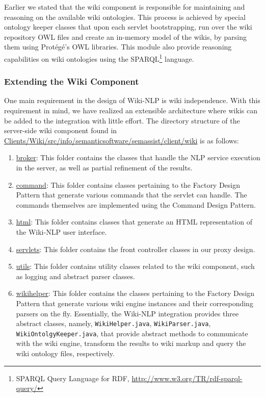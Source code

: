 \blankline
Earlier we stated that the wiki component is responsible for maintaining and reasoning on the available wiki ontologies. This process is achieved by special ontology keeper classes that upon each servlet bootstrapping, run over the wiki repository OWL files and create an in-memory model of the wikis, by parsing them using Prot\'{e}g\'{e}'s OWL libraries. This module also provide reasoning capabilities on wiki ontologies using the SPARQL\footnote{SPARQL Query Language for RDF, \url{http://www.w3.org/TR/rdf-sparql-query/}} language.

\subsubsection{Extending the Wiki Component}
One main requirement in the design of Wiki-NLP is wiki independence. With this requirement in mind, we have realized an extensible architecture where wikis can be added to the integration with little effort. The directory structure of the server-side wiki component found in \url{Clients/Wiki/src/info/semanticsoftware/semassist/client/wiki} is as follows:

\begin{enumerate}
\item\url{broker}: This folder contains the classes that handle the NLP service execution in the \sa server, as well as partial refinement of the results.
\item\url{command}: This folder contains classes pertaining to the Factory Design Pattern that generate various commands that the servlet can handle. The commands themselves are implemented using the Command Design Pattern. 
\item\url{html}: This folder contains classes that generate an HTML representation of the Wiki-NLP user interface.
\item\url{servlets}: This folder contains the front controller classes in our proxy design.
\item\url{utils}: This folder contains utility classes related to the wiki component, such as logging and abstract parser classes.
\item\url{wikihelper}: This folder contains the classes pertaining to the Factory Design Pattern that generate various wiki engine instances and their corresponding parsers on the fly. Essentially, the Wiki-NLP integration provides three abstract classes, namely, \texttt{WikiHelper.java}, \texttt{WikiParser.java}, \texttt{WikiOntolgyKeeper.java}, that provide abstract methods to communicate with the wiki engine, transform the results to wiki markup and query the wiki ontology files, respectively. 
\end{enumerate}


